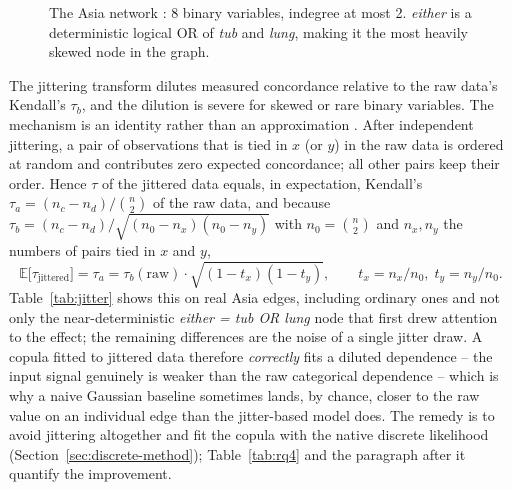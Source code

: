 \documentclass[
  english,
  class=report,
  accentcolor=2c,
  marginpar=false,
  parskip=half-,
  fontsize=11pt,
  ruledheaders=false,
  pdfa=false,
  IMRAD=false,
  thesis={type=master}
]{tudapub}
\begin{document}
\begin{figure}[ht]
\centering
{}
\caption{The Asia network \parencite{lauritzen1988}: 8 binary variables, indegree at most 2. \emph{either} is a deterministic logical OR of \emph{tub} and \emph{lung}, making it the most heavily skewed node in the graph.}
\label{fig:asia-network}
\end{figure}

The jittering transform dilutes measured concordance relative to the raw
data's Kendall's $\tau_b$, and the dilution is severe for skewed or rare
binary variables. The mechanism is an identity rather than an
approximation \parencite{denuit2005,genest2007}. After independent
jittering, a pair of observations that is tied in $x$ (or $y$) in the raw
data is ordered at random and contributes zero expected concordance; all
other pairs keep their order. Hence $\tau$ of the jittered data equals, in
expectation, Kendall's $\tau_a = (n_c - n_d)/\binom{n}{2}$ of the raw data,
and because $\tau_b = (n_c - n_d)/\sqrt{(n_0 - n_x)(n_0 - n_y)}$ with $n_0 =
\binom{n}{2}$ and $n_x, n_y$ the numbers of pairs tied in $x$ and $y$,
\[
\mathbb{E}\bigl[\tau_{\text{jittered}}\bigr] = \tau_a = \tau_b(\text{raw}) \cdot \sqrt{(1-t_x)(1-t_y)},
\qquad t_x = n_x/n_0,\; t_y = n_y/n_0 .
\]
Table~\ref{tab:jitter} shows this on real Asia edges, including ordinary
ones and not only the near-deterministic \emph{either = tub OR lung} node
that first drew attention to the effect; the remaining differences are the
noise of a single jitter draw. A copula fitted to jittered data therefore
\emph{correctly} fits a diluted dependence -- the input signal genuinely is
weaker than the raw categorical dependence -- which is why a naive
Gaussian baseline sometimes lands, by chance, closer to the raw value on an
individual edge than the jitter-based model does. The remedy is to avoid
jittering altogether and fit the copula with the native discrete likelihood
(Section~\ref{sec:discrete-method}); Table~\ref{tab:rq4} and the paragraph
after it quantify the improvement.
\end{document}

